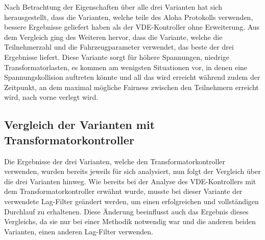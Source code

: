 Nach Betrachtung der Eigenschaften über alle drei Varianten hat sich herausgestellt, dass die Varianten, welche teile des Aloha Protokolls verwenden, bessere Ergebnisse geliefert haben als der VDE-Kontroller ohne Erweiterung. Aus dem Vergleich ging des Weiteren hervor, dass die Variante, welche die Teilnehmerzahl und die Fahrzeugparameter verwendet, das beste der drei Ergebnisse liefert. Diese Variante sorgt für höhere Spannungen, niedrige Transformatorlasten, es kommen am wenigsten Situationen vor, in denen eine Spannungskollision auftreten könnte und all das wird erreicht während zudem der Zeitpunkt, an dem maximal mögliche Fairness zwischen den Teilnehmern erreicht wird, nach vorne verlegt wird.

\subsection{Vergleich der Varianten mit Transformatorkontroller}
Die Ergebnisse der drei Varianten, welche den Transformatorkontroller verwenden, wurden bereits jeweils für sich analysiert, nun folgt der Vergleich über die drei Varianten hinweg. Wie bereits bei der Analyse des VDE-Kontrollers mit dem Transformatorkontroller erwähnt wurde, musste bei dieser Variante der verwendete Lag-Filter geändert werden, um einen erfolgreichen und vollständigen Durchlauf zu erhaltenen. Diese Änderung beeinflusst auch das Ergebnis dieses Vergleichs, da sie nur bei einer Methodik notwendig war und die anderen beiden Varianten, einen anderen Lag-Filter verwenden.\\
